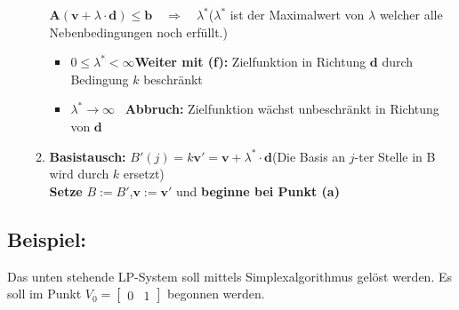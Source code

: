 \begin{enumerate}
\begin{enumerate}
	$\boxed{\mathbf{A}(\mathbf{v}+\lambda\cdot \mathbf{d})\leq \mathbf{b}}\quad\Rightarrow\quad\lambda^*$\quad($\lambda^*$ ist der Maximalwert von $\lambda$ welcher alle Nebenbedingungen noch erfüllt.)\\
	\begin{itemize}
		\item $0\leq\lambda^*<\infty$\qquad \textbf{Weiter mit (f):} Zielfunktion in Richtung $\mathbf{d}$ durch Bedingung $k$ beschränkt
		\item $\lambda^*\rightarrow\infty$\qquad\quad~ \textbf{Abbruch:} Zielfunktion wächst unbeschränkt in Richtung von $\mathbf{d}$
	\end{itemize}
	\item \textbf{Basistausch:} $B'(j)=k$\qquad $\boxed{\mathbf{v'}=\mathbf{v}+\lambda^*\cdot \mathbf{d}}$\quad (Die Basis an $j$-ter Stelle in B wird durch $k$ ersetzt)\\
	
	\textbf{Setze} $\boxed{B:=B'}$,\quad $\boxed{\mathbf{v}:=\mathbf{v'}}$ und \textbf{beginne bei Punkt (a)}
	\end{enumerate}
\end{enumerate}


\subsection{Beispiel:}
Das unten stehende LP-System soll mittels Simplexalgorithmus gelöst werden. Es soll im Punkt $V_0=\begin{bmatrix}0 & 1\end{bmatrix}$ begonnen werden.\\


